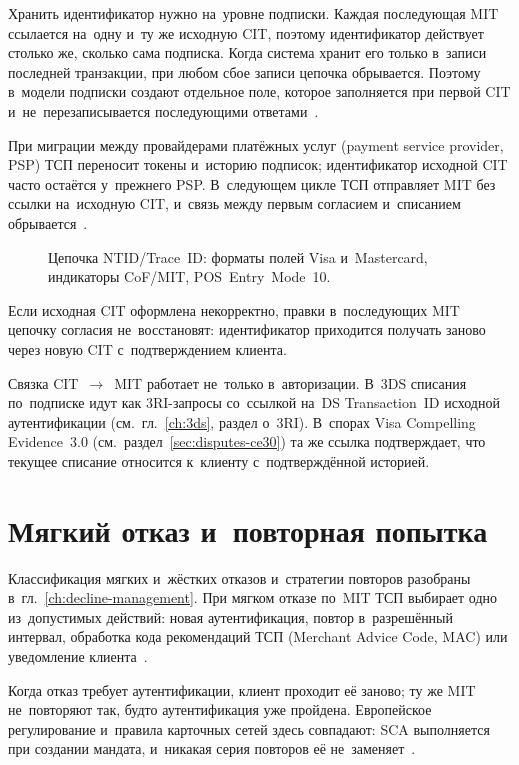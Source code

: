Хранить идентификатор нужно на~уровне подписки. Каждая последующая MIT
ссылается на~одну и~ту же исходную CIT, поэтому идентификатор действует столько же,
сколько сама подписка. Когда система хранит его только в~записи последней
транзакции, при любом сбое записи цепочка обрывается. Поэтому в~модели подписки
создают отдельное поле, которое заполняется при первой CIT
и~не~перезаписывается последующими ответами~\cite{cybs-mc-subscription-mit}.

При миграции между провайдерами платёжных услуг (payment service provider, PSP)
ТСП переносит токены и~историю подписок; идентификатор исходной CIT часто
остаётся у~прежнего PSP. В~следующем цикле ТСП отправляет MIT без ссылки
на~исходную CIT, и~связь между первым согласием и~списанием
обрывается~\cite{mc-tpr,cybs-mc-subscription-mit}.

\begin{figure}[htbp]
  \centering
  \caption{Цепочка NTID/Trace~ID: форматы полей Visa и~Mastercard,
  индикаторы CoF/MIT, POS~Entry~Mode~10.}%
  \label{fig:ntid-chain}
\end{figure}

Если исходная CIT оформлена некорректно, правки в~последующих MIT цепочку
согласия не~восстановят: идентификатор приходится получать заново через новую CIT
с~подтверждением клиента. \FloatBarrier

Связка CIT~$\to$~MIT работает не~только в~авторизации. В~3DS списания
по~подписке идут как 3RI-запросы со~ссылкой на~DS Transaction~ID исходной
аутентификации (см.~гл.~\ref{ch:3ds}, раздел о~3RI). В~спорах Visa Compelling
Evidence~3.0 (см.~раздел~\ref{sec:disputes-ce30}) та же ссылка подтверждает,
что текущее списание относится к~клиенту с~подтверждённой историей.

\section{Мягкий отказ и~повторная попытка}\label{sec:subscriptions-soft-decline}

Классификация мягких и~жёстких отказов и~стратегии повторов разобраны
в~гл.~\ref{ch:decline-management}. При мягком отказе по~MIT ТСП выбирает
одно из~допустимых действий:
новая аутентификация, повтор в~разрешённый интервал, обработка кода
рекомендаций ТСП (Merchant Advice Code, MAC) или уведомление
клиента~\cite{visa-core-rules,mc-tpr}.

Когда отказ требует аутентификации, клиент проходит её
заново; ту же MIT не~повторяют так, будто аутентификация уже пройдена.
Европейское регулирование и~правила карточных сетей здесь совпадают: SCA
выполняется при создании мандата, и~никакая серия повторов её
не~заменяет~\cite{eba-mit-qa,mc-tpr}.

